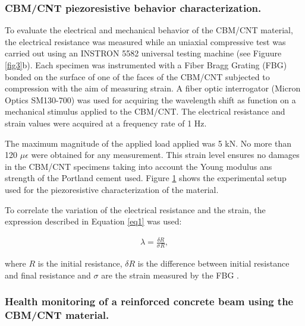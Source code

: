 \documentclass[twocolumn]{bmcart}%
\begin{document}
\subsubsection{CBM/CNT piezoresistive behavior characterization.}\label{Piezo}

To evaluate the electrical and mechanical behavior of the CBM/CNT material, the electrical resistance was measured while an uniaxial compressive test was carried out using an INSTRON 5582 universal testing machine (see Figuure \ref{fig3}b). Each specimen was instrumented with a Fiber Bragg Grating (FBG) bonded on the surface of one of the faces of the CBM/CNT subjected to compression with the aim of measuring strain. A fiber optic interrogator (Micron Optics SM130-700) was used for acquiring the wavelength shift as function on a mechanical stimulus applied to the CBM/CNT. The electrical resistance and strain values were acquired at a frequency rate of 1 Hz.

The maximum magnitude of the applied load applied was 5 kN. No more than 120 $\mu\epsilon$ were obtained for  any measurement. This strain level ensures no damages in the CBM/CNT specimens taking into account the Young modulus ans strength of the Portland cement used. Figure \ref{fig4} shows the experimental setup used for the piezoresistive characterization of the material. 

\begin{figure}[h!]
  \caption{
      }
    \label{fig4}
      \end{figure}

To correlate the variation of the electrical resistance and the strain, the expression described in Equation \ref{eq1} was used:

\begin{eqnarray}\label{eqexpmuts}
\lambda = \frac{\delta R}{\sigma R},
\label{eq1}
\end{eqnarray}

    
where $R$ is the initial resistance, $\delta R$ is the difference between initial resistance and final resistance and $\sigma$ are the strain measured by the FBG \cite{Pisello2017, Jang2017}.

\subsubsection{Health monitoring of a reinforced concrete beam using the CBM/CNT material.}\label{SHM_beam}
\end{document}
